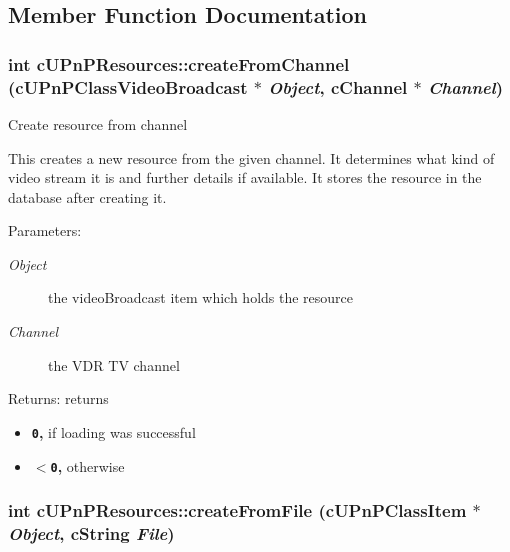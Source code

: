 \subsection{Member Function Documentation}
\hypertarget{classcUPnPResources_974dd63afd52b87732800b7cf578a387}{
\subsubsection[{createFromChannel}]{\setlength{\rightskip}{0pt plus 5cm}int cUPnPResources::createFromChannel ({\bf cUPnPClassVideoBroadcast} $\ast$ {\em Object}, \/  cChannel $\ast$ {\em Channel})}}
\label{classcUPnPResources_974dd63afd52b87732800b7cf578a387}


Create resource from channel

This creates a new resource from the given channel. It determines what kind of video stream it is and further details if available. It stores the resource in the database after creating it.

\begin{Desc}
\item[Parameters:]
\begin{description}
\item[{\em Object}]the videoBroadcast item which holds the resource \item[{\em Channel}]the VDR TV channel \end{description}
\end{Desc}
\begin{Desc}
\item[Returns:]returns\begin{itemize}
\item {\bf {\tt 0},} if loading was successful\item {\bf {\tt $<$0},} otherwise \end{itemize}
\end{Desc}
\hypertarget{classcUPnPResources_b2bac789a9caf023940dfc02a079c249}{
\subsubsection[{createFromFile}]{\setlength{\rightskip}{0pt plus 5cm}int cUPnPResources::createFromFile ({\bf cUPnPClassItem} $\ast$ {\em Object}, \/  cString {\em File})}}
\label{classcUPnPResources_b2bac789a9caf023940dfc02a079c249}


